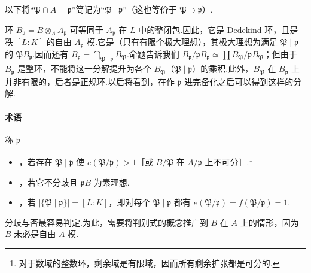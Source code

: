 以下将``$\mathfrak P\cap A=\mathfrak p$''简记为``$\mathfrak P\mid\mathfrak p$''（这也等价于 $\mathfrak P\supset\mathfrak p$）.
\begin{remark*}
环 $B_{\mathfrak p}=B\otimes_AA_{\mathfrak p}$ 可等同于 $A_{\mathfrak p}$ 在 $L$ 中的整闭包.因此，它是 Dedekind 环，且是秩 $[L:K]$ 的自由 $A_{\mathfrak p}$-模.它是（只有有限个极大理想），其极大理想为满足 $\mathfrak P\mid\mathfrak p$ 的 $\mathfrak PB_{\mathfrak p}$.因而还有 $B_{\mathfrak p}=\bigcap_{\mathfrak P\mid\mathfrak p}B_{\mathfrak P}$.命题告诉我们 $B_{\mathfrak p}/\mathfrak pB_{\mathfrak p}\simeq\prod B_{\mathfrak P}/\mathfrak pB_{\mathfrak P}$；但由于 $B_{\mathfrak p}$ 是整环，不能将这一分解提升为各个 $B_{\mathfrak P}$（$\mathfrak P\mid\mathfrak p$）的乘积.此外，$B_{\mathfrak P}$ 在 $B_{\mathfrak p}$ 上并非有限的，后者是正规环.以后将看到，在作 $\mathfrak p$-进完备化之后可以得到这样的分解.
\end{remark*}
\paragraph{术语}
称 $\mathfrak p$
\begin{itemize}
\item {}，若存在 $\mathfrak P\mid\mathfrak p$ 使 $e(\mathfrak P/\mathfrak p)>1$［或 $B/\mathfrak P$ 在 $A/\mathfrak p$ 上不可分］.\footnote{对于数域的整数环，剩余域是有限域，因而所有剩余扩张都是可分的.}
\item {}，若它不分歧且 $\mathfrak pB$ 为素理想.
\item {}，若 $|\{\mathfrak P\mid\mathfrak p\}|=[L:K]$，即对每个 $\mathfrak P\mid\mathfrak p$ 都有 $e(\mathfrak P/\mathfrak p)=f(\mathfrak P/\mathfrak p)=1$.
\end{itemize}
分歧与否最容易判定.为此，需要将判别式的概念推广到 $B$ 在 $A$ 上的情形，因为 $B$ 未必是自由 $A$-模.

